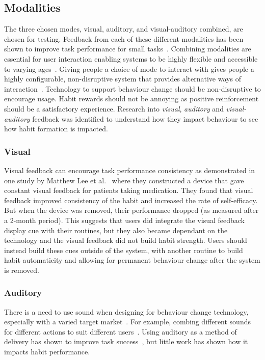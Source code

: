 
\subsection{Modalities}
The three chosen modes, visual, auditory, and visual-auditory combined, are chosen for testing. Feedback from each of these different modalities has been shown to improve task performance for small tasks~\cite{chi_oussama_tap_the_shapetones}. Combining modalities are essential for user interaction enabling systems to be highly flexible and accessible to varying ages~\cite{article_user_centred_multimodal_reminders}. Giving people a choice of mode to interact with gives people a highly configurable, non-disruptive system that provides alternative ways of interaction~\cite{article_designing_multimodal_reminders_for_home, multi_modal_reminders_less_disruptive}. Technology to support behaviour change should be non-disruptive to encourage usage. Habit rewards should not be annoying as positive reinforcement should be a satisfactory experience. Research into \textit{visual}, \textit{auditory} and \textit{visual-auditory} feedback was identified to understand how they impact behaviour to see how habit formation is impacted.

\subsubsection{Visual}
Visual feedback can encourage task performance consistency as demonstrated in one study by Matthew Lee et al.~\cite{article_realtime_feedback_improving_medication_taking} where they constructed a device that gave constant visual feedback for patients taking medication. They found that visual feedback improved consistency of the habit and increased the rate of self-efficacy. But when the device was removed, their performance dropped (as measured after a 2-month period). This suggests that users did integrate the visual feedback display cue with their routines, but they also became dependant on the technology and the visual feedback did not build habit strength. Users should instead build these cues outside of the system, with another routine to build habit automaticity and allowing for permanent behaviour change after the system is removed.

\subsubsection{Auditory}
There is a need to use sound when designing for behaviour change technology, especially with a varied target market~\cite{article_designing_for_health_behaviour_change_hci}. For example, combing different sounds for different actions to suit different users~\cite{article_movipill_improving_medication_elders}. Using auditory as a method of delivery has shown to improve task success~\cite{auditory_notifications_increase_delivery_success}, but little work has shown how it impacts habit performance.

